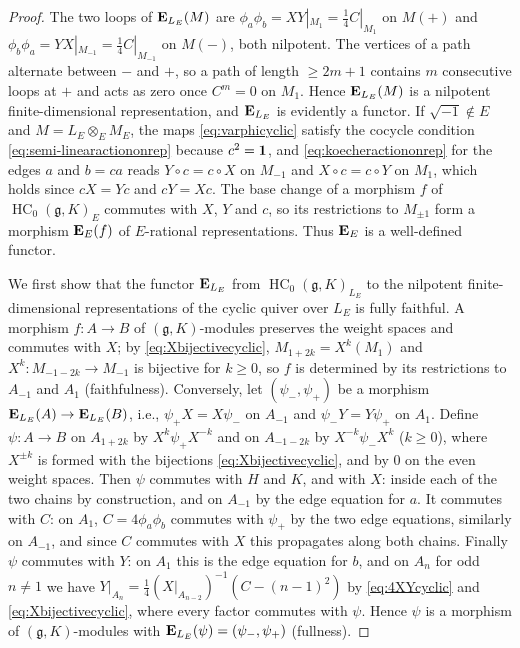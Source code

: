 \documentclass[a4paper,12pt,reqno]{amsart}
\newcommand{\EE}{{\rm\bf E}}
\DeclareMathOperator{\HC}{\mathrm{HC}}
\theoremstyle{plain}
\theoremstyle{remark}
\begin{document}
\begin{proof}
    \smallskip
    The two loops of $\EE_{L_E}(M)$ are $\phi_a\phi_b=XY|_{M_1}=\frac14C|_{M_1}$ on $M(+)$ and $\phi_b\phi_a=YX|_{M_{-1}}=\frac14C|_{M_{-1}}$ on $M(-)$, both nilpotent. The vertices of a path alternate between $-$ and $+$, so a path of length $\geq 2m+1$ contains $m$ consecutive loops at $+$ and acts as zero once $C^m=0$ on $M_1$. Hence $\EE_{L_E}(M)$ is a nilpotent finite-dimensional representation, and $\EE_{L_E}$ is evidently a functor. If $\sqrt{-1}\not\in E$ and $M=L_E\otimes_E M_E$, the maps \eqref{eq:varphicyclic} satisfy the cocycle condition \eqref{eq:semi-linearactiononrep} because $c^2={\bf1}$, and \eqref{eq:koecheractiononrep} for the edges $a$ and $b=ca$ reads $Y\circ c=c\circ X$ on $M_{-1}$ and $X\circ c=c\circ Y$ on $M_1$, which holds since $cX=Yc$ and $cY=Xc$. The base change of a morphism $f$ of $\HC_0(\mathfrak{g},K)_E$ commutes with $X$, $Y$ and $c$, so its restrictions to $M_{\pm1}$ form a morphism $\EE_E(f)$ of $E$-rational representations. Thus $\EE_E$ is a well-defined functor.

    \smallskip
    We first show that the functor $\EE_{L_E}$ from $\HC_0(\mathfrak{g},K)_{L_E}$ to the nilpotent finite-dimensional representations of the cyclic quiver over $L_E$ is fully faithful. A morphism $f\colon A\to B$ of $(\mathfrak{g},K)$-modules preserves the weight spaces and commutes with $X$; by \eqref{eq:Xbijectivecyclic}, $M_{1+2k}=X^k(M_1)$ and $X^k\colon M_{-1-2k}\to M_{-1}$ is bijective for $k\geq0$, so $f$ is determined by its restrictions to $A_{-1}$ and $A_1$ (faithfulness). Conversely, let $(\psi_-,\psi_+)$ be a morphism $\EE_{L_E}(A)\to\EE_{L_E}(B)$, i.e., $\psi_+X=X\psi_-$ on $A_{-1}$ and $\psi_-Y=Y\psi_+$ on $A_1$. Define $\psi\colon A\to B$ on $A_{1+2k}$ by $X^k\psi_+X^{-k}$ and on $A_{-1-2k}$ by $X^{-k}\psi_-X^{k}$ ($k\geq0$), where $X^{\pm k}$ is formed with the bijections \eqref{eq:Xbijectivecyclic}, and by $0$ on the even weight spaces. Then $\psi$ commutes with $H$ and $K$, and with $X$: inside each of the two chains by construction, and on $A_{-1}$ by the edge equation for $a$. It commutes with $C$: on $A_1$, $C=4\phi_a\phi_b$ commutes with $\psi_+$ by the two edge equations, similarly on $A_{-1}$, and since $C$ commutes with $X$ this propagates along both chains. Finally $\psi$ commutes with $Y$: on $A_1$ this is the edge equation for $b$, and on $A_n$ for odd $n\neq1$ we have $Y|_{A_n}=\frac14\left(X|_{A_{n-2}}\right)^{-1}\left(C-(n-1)^2\right)$ by \eqref{eq:4XYcyclic} and \eqref{eq:Xbijectivecyclic}, where every factor commutes with $\psi$. Hence $\psi$ is a morphism of $(\mathfrak{g},K)$-modules with $\EE_{L_E}(\psi)=(\psi_-,\psi_+)$ (fullness).


\end{proof}
\end{document}
